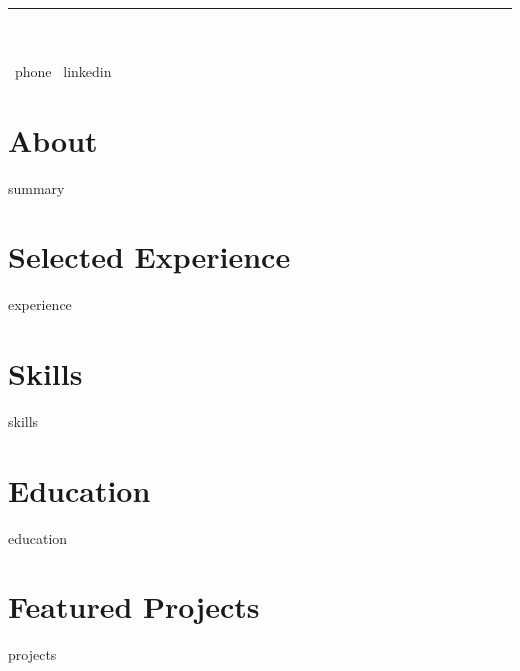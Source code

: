 \documentclass[11pt]{article}
\begin{document}
\pagestyle{empty}
\\
\textcolor{accent}{\rule{\linewidth}{1pt}}\\[6pt]
\\
 \textbar\ {phone} \textbar\ {linkedin}
\vspace{12pt}

\section*{About}
{summary}

\section*{Selected Experience}
{experience}

\section*{Skills}
{skills}

\section*{Education}
{education}

\section*{Featured Projects}
{projects}
\end{document}
